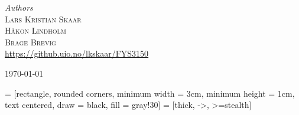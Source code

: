 \begin{titlepage}
		{\large\textit{Authors}}\\
		\textsc{Lars Kristian Skaar}\\
		\textsc{Håkon Lindholm}\\
		\textsc{Brage Brevig} %
		\\
		\url{https://github.uio.no/lkskaar/FYS3150}
		
		\vfill\vfill\vfill %
		
		{\large\today} %
		
		
		\vfill\vfill
		
		
		
	\end{titlepage}

	\newpage
	\setlength\parindent{0pt}
	 = [rectangle, rounded corners, minimum width = 3cm, minimum height = 1cm, text centered, draw = black, fill = gray!30]
	 = [thick, ->, >=stealth]
